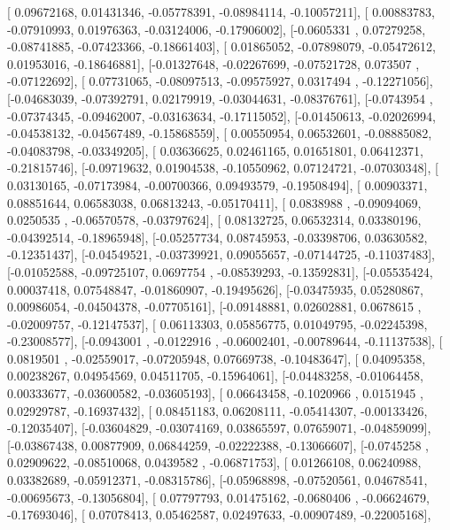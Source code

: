 \documentclass{article}
\begin{document}
       [ 0.09672168,  0.01431346, -0.05778391, -0.08984114, -0.10057211],
       [ 0.00883783, -0.07910993,  0.01976363, -0.03124006, -0.17906002],
       [-0.0605331 ,  0.07279258, -0.08741885, -0.07423366, -0.18661403],
       [ 0.01865052, -0.07898079, -0.05472612,  0.01953016, -0.18646881],
       [-0.01327648, -0.02267699, -0.07521728,  0.073507  , -0.07122692],
       [ 0.07731065, -0.08097513, -0.09575927,  0.0317494 , -0.12271056],
       [-0.04683039, -0.07392791,  0.02179919, -0.03044631, -0.08376761],
       [-0.0743954 , -0.07374345, -0.09462007, -0.03163634, -0.17115052],
       [-0.01450613, -0.02026994, -0.04538132, -0.04567489, -0.15868559],
       [ 0.00550954,  0.06532601, -0.08885082, -0.04083798, -0.03349205],
       [ 0.03636625,  0.02461165,  0.01651801,  0.06412371, -0.21815746],
       [-0.09719632,  0.01904538, -0.10550962,  0.07124721, -0.07030348],
       [ 0.03130165, -0.07173984, -0.00700366,  0.09493579, -0.19508494],
       [ 0.00903371,  0.08851644,  0.06583038,  0.06813243, -0.05170411],
       [ 0.0838988 , -0.09094069,  0.0250535 , -0.06570578, -0.03797624],
       [ 0.08132725,  0.06532314,  0.03380196, -0.04392514, -0.18965948],
       [-0.05257734,  0.08745953, -0.03398706,  0.03630582, -0.12351437],
       [-0.04549521, -0.03739921,  0.09055657, -0.07144725, -0.11037483],
       [-0.01052588, -0.09725107,  0.0697754 , -0.08539293, -0.13592831],
       [-0.05535424,  0.00037418,  0.07548847, -0.01860907, -0.19495626],
       [-0.03475935,  0.05280867,  0.00986054, -0.04504378, -0.07705161],
       [-0.09148881,  0.02602881,  0.0678615 , -0.02009757, -0.12147537],
       [ 0.06113303,  0.05856775,  0.01049795, -0.02245398, -0.23008577],
       [-0.0943001 , -0.0122916 , -0.06002401, -0.00789644, -0.11137538],
       [ 0.0819501 , -0.02559017, -0.07205948,  0.07669738, -0.10483647],
       [ 0.04095358,  0.00238267,  0.04954569,  0.04511705, -0.15964061],
       [-0.04483258, -0.01064458,  0.00333677, -0.03600582, -0.03605193],
       [ 0.06643458, -0.1020966 ,  0.0151945 ,  0.02929787, -0.16937432],
       [ 0.08451183,  0.06208111, -0.05414307, -0.00133426, -0.12035407],
       [-0.03604829, -0.03074169,  0.03865597,  0.07659071, -0.04859099],
       [-0.03867438,  0.00877909,  0.06844259, -0.02222388, -0.13066607],
       [-0.0745258 ,  0.02909622, -0.08510068,  0.0439582 , -0.06871753],
       [ 0.01266108,  0.06240988,  0.03382689, -0.05912371, -0.08315786],
       [-0.05968898, -0.07520561,  0.04678541, -0.00695673, -0.13056804],
       [ 0.07797793,  0.01475162, -0.0680406 , -0.06624679, -0.17693046],
       [ 0.07078413,  0.05462587,  0.02497633, -0.00907489, -0.22005168],
\end{document}
